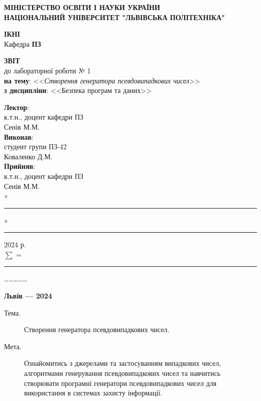 \documentclass[oneside,14pt]{extarticle}
\newcommand\subject{Безпека програм та даних}
\newcommand\lecturer{к.т.н., доцент кафедри ПЗ\\Сенів М.М.}
\newcommand\teacher{к.т.н., доцент кафедри ПЗ\\Сенів М.М.}
\newcommand\mygroup{ПЗ-42}
\newcommand\lab{1}
\newcommand\theme{Створення генератора псевдовипадкових чисел}
\newcommand\purpose{Ознайомитись з джерелами та застосуванням випадкових
	чисел, алгоритмами генерування псевдовипадкових чисел та навчитись
	створювати програмні генератори псевдовипадкових чисел для використання в
	системах захисту інформації}
\begin{document}
\begin{normalsize}
	\begin{titlepage}
		\thispagestyle{empty}
		\begin{center}
			\textbf{МІНІСТЕРСТВО ОСВІТИ І НАУКИ УКРАЇНИ\\
				НАЦІОНАЛЬНИЙ УНІВЕРСИТЕТ "ЛЬВІВСЬКА ПОЛІТЕХНІКА"}
		\end{center}
		\begin{flushright}
			\textbf{ІКНІ}\\
			Кафедра \textbf{ПЗ}
		\end{flushright}
		\vspace{80pt}
		\begin{center}
			\textbf{ЗВІТ}\\
			\vspace{10pt}
			до лабораторної роботи № \lab\\
			\textbf{на тему}: <<\textit{\theme}>>\\
			\textbf{з дисципліни}: <<\subject>>
		\end{center}
		\vspace{80pt}
		\begin{flushright}
			
			\textbf{Лектор}:\\
			\lecturer\\
			\vspace{28pt}
			\textbf{Виконав}:\\
			
			студент групи \mygroup\\
			Коваленко Д.М.\\
			\vspace{28pt}
			\textbf{Прийняв}:\\
			
			\teacher\\
			
			\vspace{28pt}
			«\rule{1cm}{0.15mm}» \rule{1.5cm}{0.15mm} 2024 р.\\
			$\sum$ = \rule{1cm}{0.15mm}……………\\
			
		\end{flushright}
		\vspace{\fill}
		\begin{center}
			\textbf{Львів — 2024}
		\end{center}
	\end{titlepage}
		
	\begin{description}
		\item[Тема.] \theme.
		\item[Мета.] \purpose.
	\end{description}


\end{normalsize}
\end{document}
